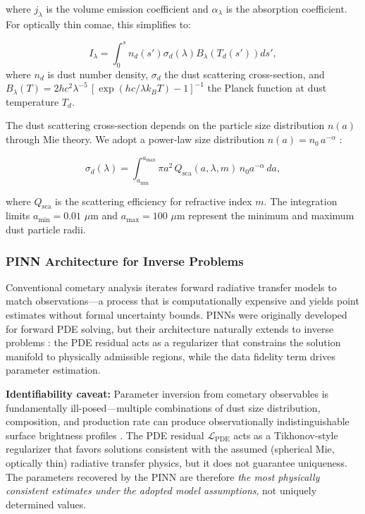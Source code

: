 \documentclass[preprint2]{aastex631}
\begin{document}
where $j_\lambda$ is the volume emission coefficient and $\alpha_\lambda$ is the absorption coefficient. For optically thin comae, this simplifies to:

\begin{equation}\label{eq:thin_dust}
I_\lambda = \int_{0}^{s} n_d(s') \sigma_d(\lambda) B_\lambda(T_d(s')) ds',
\end{equation}
where $n_d$ is dust number density, $\sigma_d$ the dust scattering cross-section, and $B_\lambda(T) = 2hc^2\lambda^{-5}\,[\exp(hc/\lambda k_B T) - 1]^{-1}$ the Planck function at dust temperature $T_d$.

The dust scattering cross-section depends on the particle size distribution $n(a)$ through Mie theory. We adopt a power-law size distribution $n(a) = n_0\, a^{-\alpha}$ \citep{kolokolova04}:

\begin{equation}\label{eq:mie_sigma}
\sigma_d(\lambda) = \int_{a_{\min}}^{a_{\max}} \pi a^2 \, Q_{\text{sca}}(a, \lambda, m) \, n_0 a^{-\alpha} \, da,
\end{equation}

where $Q_{\text{sca}}$ is the scattering efficiency for refractive index $m$. The integration limits $a_{\min} = 0.01$ $\mu$m and $a_{\max} = 100$ $\mu$m represent the minimum and maximum dust particle radii.

\subsubsection{PINN Architecture for Inverse Problems}

Conventional cometary analysis iterates forward radiative transfer models to match observations---a process that is computationally expensive and yields point estimates without formal uncertainty bounds. PINNs \citep{raissi19} were originally developed for forward PDE solving, but their architecture naturally extends to inverse problems \citep{lu21}: the PDE residual acts as a regularizer that constrains the solution manifold to physically admissible regions, while the data fidelity term drives parameter estimation.

\textbf{Identifiability caveat:} Parameter inversion from cometary observables is fundamentally ill-posed---multiple combinations of dust size distribution, composition, and production rate can produce observationally indistinguishable surface brightness profiles \citep{fulle10}. The PDE residual $\mathcal{L}_{\text{PDE}}$ acts as a Tikhonov-style regularizer that favors solutions consistent with the assumed (spherical Mie, optically thin) radiative transfer physics, but it does not guarantee uniqueness. The parameters recovered by the PINN are therefore \textit{the most physically consistent estimates under the adopted model assumptions}, not uniquely determined values.
\end{document}
